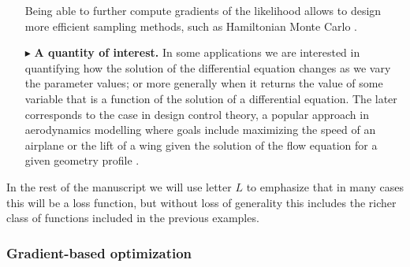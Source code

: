 \begin{itemize}
    Being able to further compute gradients of the likelihood allows to design more efficient sampling methods, such as Hamiltonian Monte Carlo \cite{Betancourt_2017}.
    \item[$ \blacktriangleright$] \textbf{A quantity of interest.} In some applications we are interested in quantifying how the solution of the differential equation changes as we vary the parameter values; or more generally when it returns the value of some variable that is a function of the solution of a differential equation. The later corresponds to the case in design control theory, a popular approach in aerodynamics modelling where goals include maximizing the speed of an airplane or the lift of a wing given the solution of the flow equation for a given geometry profile \cite{Jameson_1988,Giles:2000wp,Mohammadi:2004dg}. 
\end{itemize}
In the rest of the manuscript we will use letter $L$ to emphasize that in many cases this will be a loss function, but without loss of generality this includes the richer class of functions included in the previous examples. 

\subsubsection{Gradient-based optimization}

